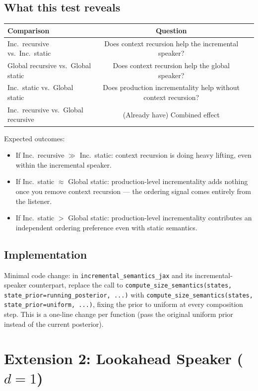 \documentclass[11pt, a4paper]{article}
\begin{document}
\subsection{What this test reveals}

\begin{center}
\begin{tabular}{lcc}
\toprule
\textbf{Comparison} & \textbf{Question} \\
\midrule
Inc.\ recursive vs.\ Inc.\ static & Does context recursion help the incremental speaker? \\
Global recursive vs.\ Global static & Does context recursion help the global speaker? \\
Inc.\ static vs.\ Global static & Does production incrementality help without context recursion? \\
Inc.\ recursive vs.\ Global recursive & (Already have) Combined effect \\
\bottomrule
\end{tabular}
\end{center}

Expected outcomes:
\begin{itemize}
  \item If Inc.\ recursive $\gg$ Inc.\ static: context recursion is doing heavy lifting, even within the incremental speaker.
  \item If Inc.\ static $\approx$ Global static: production-level incrementality adds nothing once you remove context recursion --- the ordering signal comes entirely from the listener.
  \item If Inc.\ static $>$ Global static: production-level incrementality contributes an independent ordering preference even with static semantics.
\end{itemize}

\subsection{Implementation}

Minimal code change: in \texttt{incremental\_semantics\_jax} and its incremental-speaker counterpart, replace the call to \texttt{compute\_size\_semantics(states, state\_prior=running\_posterior, ...)} with \texttt{compute\_size\_semantics(states, state\_prior=uniform, ...)}, fixing the prior to uniform at every composition step.
This is a one-line change per function (pass the original uniform prior instead of the current posterior).


\section{Extension 2: Lookahead Speaker ($d = 1$)}
\end{document}
